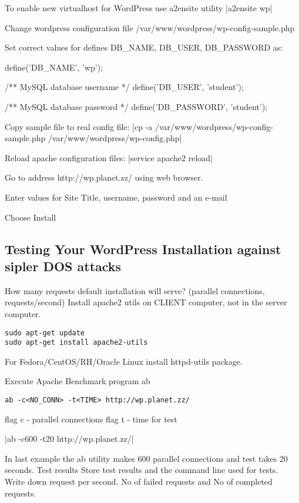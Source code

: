 To enable new virtualhost for WordPress use a2ensite utility
|a2ensite wp|

Change wordpress configuration file
/var/www/wordpress/wp-config-sample.php

Set correct values for defines DB\_NAME, DB\_USER, DB\_PASSWORD as:

define('DB\_NAME', 'wp');

/** MySQL database username */
define('DB\_USER', 'student');

/** MySQL database password */
define('DB\_PASSWORD', 'student');


Copy sample file to real config file:
|cp  -a /var/www/wordpress/wp-config-sample.php /var/www/wordpress/wp-config.php|

Reload apache configuration files:
|service  apache2 reload|

Go to address http://wp.planet.zz/ using web browser.

Enter values for  Site Title, username, password and an e-mail

Choose Install

\subsection{Testing Your WordPress Installation against sipler DOS attacks}


How many requests default installation will serve? (parallel connections, requests/second)
Install apache2 utils on CLIENT computer, not in the server computer.

\begin{verbatim}
sudo apt-get update
sudo apt-get install apache2-utils
\end{verbatim}

For Fedora/CentOS/RH/Oracle Linux install httpd-utils package.

Execute Apache Benchmark program ab
\begin{verbatim}
ab -c<NO_CONN> -t<TIME> http://wp.planet.zz/
\end{verbatim}
flag c - parallel connections
flag t - time for test

|ab -c600 -t20 http://wp.planet.zz/|

In last example the ab utility makes 600 parallel connections and test takes 20 seconds.
Test results
Store test results and the command line used for tests.
Write down request per second. No of failed requests and No of completed requests.

